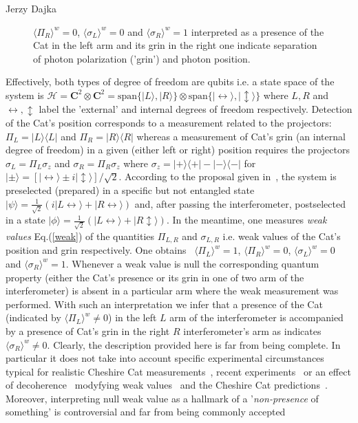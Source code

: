 \begin{artengenv}{Jerzy Dajka}
\begin{figure}
{$\langle \Pi_R\rangle^w=0$, 
$\langle \sigma_L\rangle^w =0$ and $\langle \sigma_R\rangle^w=1$ interpreted as a presence of the Cat in the left arm and its grin in the right one indicate separation of photon polarization ('grin') and photon position. }\label{cat}
\end{figure}
Effectively, both types of degree of freedom are qubits i.e. a state space of the  system is
$\mathcal{H}=\mathbf{C}^2\otimes\mathbf{C}^2=\mbox{span}\{|L\rangle,|R\rangle\}\otimes\mbox{span}\{|\leftrightarrow\rangle,|\updownarrow\rangle\}$  
where $L,R$ and $\leftrightarrow,\updownarrow$ label the 'external' and internal degrees of freedom respectively. 
Detection of  the Cat's position  corresponds to a measurement related to the projectors: $\Pi_L=|L\rangle\langle L|$ and $
\Pi_R=|R\rangle\langle R|$
whereas a measurement of Cat's grin (an internal degree of freedom) in a given (either left or right) position requires the projectors $\sigma_L = \Pi_L \sigma_z$ and $\sigma_R =  \Pi_R \sigma_z$
where  $\sigma_z=|+\rangle\langle+|-|-\rangle\langle -|$ for $|\pm\rangle=[|\leftrightarrow\rangle \pm i|\updownarrow\rangle]/\sqrt{2}$. 
%
According to the proposal given in~\parencite{cat}, the system is preselected (prepared) in a  specific but not entangled state
$|\psi\rangle = \frac{1}{\sqrt{2}}\left(i|L\leftrightarrow\rangle +|R \leftrightarrow\rangle\right)$
and, after passing the interferometer,  postselected in a state
$|\phi\rangle = \frac{1}{\sqrt{2}}\left( |L\leftrightarrow\rangle +|R \updownarrow\rangle\right)$.   
%
In the meantime, one measures {\it weak values} Eq.(\ref{weak}) of the quantities $\Pi_{L,R}$ and $\sigma_{L,R}$ i.e. weak values of the Cat's position and grin respectively. One obtains~\parencite{cat}
$
\langle \Pi_L\rangle^w =1$,
$\langle \Pi_R\rangle^w=0$, 
$\langle \sigma_L\rangle^w =0$ and $\langle \sigma_R\rangle^w=1$. 
% 
Whenever a weak value is null the corresponding quantum property (either the Cat's presence or its grin in one of two arm of the interferometer) is absent in a particular arm  where the weak measurement was performed. With such an interpretation we infer that a presence of the Cat (indicated by $
\langle \Pi_L\rangle^w \neq 0$) in the left $L$ arm of the interferometer is accompanied by a presence of Cat's grin in the right $R$ interferometer's arm as indicates $\langle \sigma_R\rangle^w\neq 0$. Clearly, the description provided here is far from being complete. In particular it does not take into account specific experimental circumstances typical for realistic Cheshire Cat measurements~\parencite{dup}, recent experiments~\parencite{c2,cat_schlos} or an effect of decoherence~\parencite{schloss} modyfying weak values~\parencite{Shik} and the Cheshire Cat predictions~\parencite{mojkot,mojkot1}. Moreover, interpreting null weak value as a hallmark of a '{\it non-presence} of something' is controversial and  far from being commonly accepted  

\end{artengenv}

